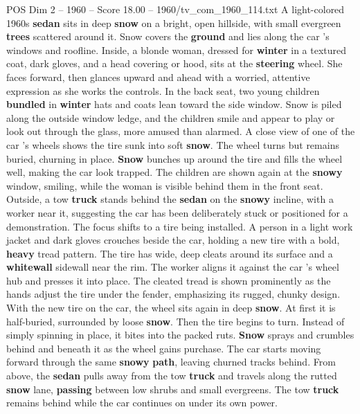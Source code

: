 \begin{textsample}{POS Dim 2 – 1960 – Score 18.00 – 1960/tv\_com\_1960\_114.txt}  \label{ex:f2_pos_010}
A light-colored 1960s \textbf{sedan} sits in deep \textbf{snow} on a bright, open hillside, with small evergreen \textbf{trees} scattered around it.
Snow covers the \textbf{ground} and lies along the car ’s windows and roofline.
Inside, a blonde woman, dressed for \textbf{winter} in a textured coat, dark gloves, and a head covering or hood, sits at the \textbf{steering} wheel.
She faces forward, then glances upward and ahead with a worried, attentive expression as she works the controls.
In the back seat, two young children \textbf{bundled} in \textbf{winter} hats and coats lean toward the side window.
Snow is piled along the outside window ledge, and the children smile and appear to play or look out through the glass, more amused than alarmed.
A close view of one of the car ’s wheels shows the tire sunk into soft \textbf{snow}.
The wheel turns but remains buried, churning in place. \textbf{Snow} bunches up around the tire and fills the wheel well, making the car look trapped.
The children are shown again at the \textbf{snowy} window, smiling, while the woman is visible behind them in the front seat.
Outside, a tow \textbf{truck} stands behind the \textbf{sedan} on the \textbf{snowy} incline, with a worker near it, suggesting the car has been deliberately stuck or positioned for a demonstration.
The focus shifts to a tire being installed.
A person in a light work jacket and dark gloves crouches beside the car, holding a new tire with a bold, \textbf{heavy} tread pattern.
The tire has wide, deep cleats around its surface and a \textbf{whitewall} sidewall near the rim.
The worker aligns it against the car ’s wheel hub and presses it into place.
The cleated tread is shown prominently as the hands adjust the tire under the fender, emphasizing its rugged, chunky design.
With the new tire on the car, the wheel sits again in deep \textbf{snow}.
At first it is half-buried, surrounded by loose \textbf{snow}.
Then the tire begins to turn.
Instead of simply spinning in place, it bites into the packed ruts. \textbf{Snow} sprays and crumbles behind and beneath it as the wheel gains purchase.
The car starts moving forward through the same \textbf{snowy} \textbf{path}, leaving churned tracks behind.
From above, the \textbf{sedan} pulls away from the tow \textbf{truck} and travels along the rutted \textbf{snow} lane, \textbf{passing} between low shrubs and small evergreens.
The tow \textbf{truck} remains behind while the car continues on under its own power.

\end{textsample}
